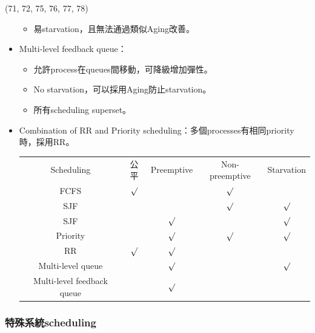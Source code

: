 \begin{theorem}{(71, 72, 75, 76, 77, 78)}
\begin{itemize}
\begin{itemize}
            \item 易starvation，且無法通過類似Aging改善。
        \end{itemize}
        \item Multi-level feedback queue：\begin{itemize}
            \item 允許process在queues間移動，可降級增加彈性。
            \item No starvation，可以採用Aging防止starvation。
            \item 所有scheduling superset。
        \end{itemize}
        \item Combination of RR and Priority scheduling：多個processes有相同priority時，採用RR。
        \begin{table}[H]
            \centering
            \begin{tabular}{|c|c|c|c|c|}
                \hline
                Scheduling & 公平 & Preemptive & Non-preemptive & Starvation \\
                \Xhline{2\arrayrulewidth}
                FCFS & $\surd$ & & $\surd$ & \\
                \hline
                SJF & & & $\surd$ & $\surd$ \\
                \hline
                SJF & & $\surd$ & & $\surd$ \\
                \hline
                Priority & & $\surd$ & $\surd$ & $\surd$\\
                \hline
                RR & $\surd$ & $\surd$ & & \\
                \hline
                Multi-level queue & & $\surd$ & & $\surd$ \\
                \hline
                Multi-level feedback queue & & $\surd$ & & \\
                \hline
            \end{tabular}
        \end{table}
    \end{itemize}
\end{theorem}

\subsubsection{特殊系統scheduling}

